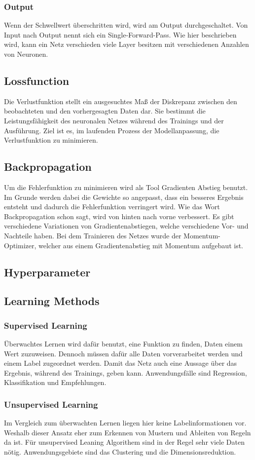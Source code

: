 \subsubsection{Output}
Wenn der Schwellwert überschritten wird, wird am Output durchgeschaltet.
Von Input nach Output nennt sich ein Single-Forward-Pass. Wie hier beschrieben wird, kann ein Netz verschieden viele Layer besitzen mit verschiedenen Anzahlen von Neuronen.

\subsection{Lossfunction}
Die Verlustfunktion stellt ein ausgesuchtes Maß der Diskrepanz zwischen den beobachteten und den vorhergesagten Daten dar. Sie bestimmt die Leistungsfähigkeit des neuronalen Netzes während des Trainings und der Ausführung. Ziel ist es, im laufenden Prozess der Modellanpassung, die Verlustfunktion zu minimieren.

\subsection{Backpropagation}
Um die Fehlerfunktion zu minimieren wird als Tool Gradienten Abstieg benutzt. Im Grunde werden dabei die Gewichte so angepasst, dass ein besseres Ergebnis entsteht und dadurch die Fehlerfunktion verringert wird. Wie das Wort Backpropagation schon sagt, wird von hinten nach vorne verbessert. Es gibt verschiedene Variationen von Gradientenabstiegen, welche verschiedene Vor- und Nachteile haben. Bei dem Trainieren des Netzes wurde der Momentum-Optimizer, welcher aus einem Gradientenabstieg mit Momentum aufgebaut ist.

\subsection{Hyperparameter}


\subsection{Learning Methods}

\subsubsection{Supervised Learning}
Überwachtes Lernen wird dafür benutzt, eine Funktion zu finden, Daten einem Wert zuzuweisen. Dennoch müssen dafür alle Daten vorverarbeitet werden und einem Label zugeordnet werden. Damit das Netz auch eine Aussage über das Ergebnis, während des Trainings, geben kann. Anwendungsfälle sind Regression, Klassifikation und Empfehlungen.

\subsubsection{Unsupervised Learning}
Im Vergleich zum überwachten Lernen liegen hier keine Labelinformationen vor. Weshalb dieser Ansatz eher zum Erkennen von Mustern und Ableiten von Regeln da ist. Für unsupervised Leaning Algorithem sind in der Regel sehr viele Daten nötig. Anwendungsgebiete sind das Clustering und die Dimensionsreduktion.
